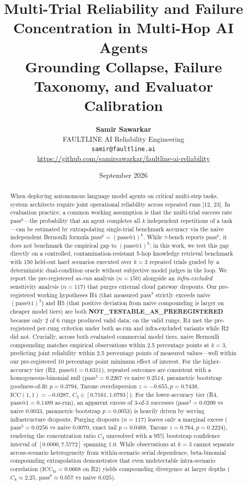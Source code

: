 \documentclass[11pt,letterpaper]{article}
\title{\textbf{Multi-Trial Reliability and Failure Concentration in Multi-Hop AI Agents}\\[0.3em]\large Grounding Collapse, Failure Taxonomy, and Evaluator Calibration}
\author{
  \textbf{Samir Sawarkar}\\
  FAULTLINE AI Reliability Engineering\\
  \texttt{samir@faultline.ai}\\
  \url{https://github.com/samirsawarkar/faultline-ai-reliability}
}
\date{September 2026}
\begin{document}
\sloppy
\maketitle

\begin{abstract}
When deploying autonomous language model agents on critical multi-step tasks, system architects require joint operational reliability across repeated runs [12, 23]. In evaluation practice, a common working assumption is that the multi-trial success rate $\text{pass}^k$—the probability that an agent completes all $k$ independent repetitions of a task—can be estimated by extrapolating single-trial benchmark accuracy via the naive independent Bernoulli formula $\text{pass}^k = (\text{pass@1})^k$. While $\tau$-bench reports $\text{pass}^k$, it does not benchmark the empirical gap to $(\text{pass@1})^k$; in this work, we test this gap directly on a controlled, contamination-resistant 5-hop knowledge retrieval benchmark with 150 held-out hard scenarios executed over $k=3$ repeated trials graded by a deterministic dual-condition oracle without subjective model judges in the loop. We report the pre-registered \emph{as-run} analysis ($n=150$) alongside an \emph{infra-excluded} sensitivity analysis ($n=117$) that purges external cloud gateway dropouts. Our pre-registered working hypotheses H4 (that measured $\text{pass}^3$ strictly exceeds naive $(\text{pass@1})^3$) and H5 (that positive deviation from naive compounding is larger on cheaper model tiers) are both \textbf{NOT\_TESTABLE\_AS\_PREREGISTERED} because only 2 of 6 rungs produced valid data; on the valid rungs, R4 met the pre-registered per-rung criterion under both as-run and infra-excluded variants while R2 did not. Crucially, across both evaluated commercial model tiers, naive Bernoulli compounding matches empirical observations within 2.5 percentage points at $k=3$, predicting joint reliability within 2.5 percentage points of measured values—well within our pre-registered 10 percentage point minimum effect of interest. For the higher-accuracy tier (R2, $\text{pass@1} = 0.6311$), repeated outcomes are consistent with a homogeneous-binomial null ($\text{pass}^3 = 0.2267$ vs naive $0.2514$, parametric bootstrap goodness-of-fit $p = 0.3794$, Tarone overdispersion $z = -0.655, p = 0.7438$, $\text{ICC}(1,1) = -0.0287$, $C_3 \in [0.7161, 1.0793]$). For the lower-accuracy tier (R4, $\text{pass@1} = 0.1489$ as-run), an apparent excess of 3-of-3 successes ($\text{pass}^3 = 0.0200$ vs naive $0.0033$, parametric bootstrap $p = 0.0053$) is heavily driven by serving infrastructure dropouts. Purging dropouts ($n=117$) leaves only a marginal excess ($\text{pass}^3 = 0.0256$ vs naive $0.0070$, exact tail $p = 0.0488$, Tarone $z = 0.764, p = 0.2224$), rendering the concentration ratio $C_3$ unresolved with a 95\% bootstrap confidence interval of $[0.0000, 7.5772]$ spanning 1.0. While observations at $k=3$ cannot separate across-scenario heterogeneity from within-scenario serial dependence, beta-binomial compounding extrapolation demonstrates that even undetectable intra-scenario correlation ($\text{ICC}_{\text{hi}} = 0.0668$ on R2) yields compounding divergence at larger depths ($C_8 \approx 2.25$, $\text{pass}^8 \approx 0.057$ vs naive $0.025$). 
\end{abstract}
\end{document}

